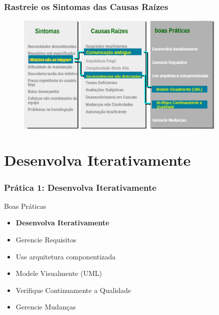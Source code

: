 \begin{frame}
 \frametitle{Rastreie os Sintomas das Causas Raízes}
  \begin{figure}
   \centering
   \includegraphics[width = 0.9\textwidth]{figs/fig6.png}
  \end{figure}
\end{frame}
\section{Desenvolva Iterativamente}
\begin{frame}
 \frametitle{Prática 1: Desenvolva Iterativamente}
 \begin{block}{Boas Práticas}
 \begin{itemize}
  \item \textbf{Desenvolva Iterativamente}
  \item Gerencie Requisitos
  \item Use arquitetura componentizada
  \item  Modele Visualmente (UML)
  \item  Verifique Continuamente a Qualidade
  \item Gerencie Mudanças  
 \end{itemize}
\end{block}
\end{frame}

